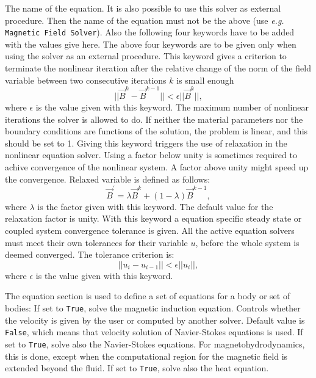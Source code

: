 \sifbegin
{} 
The name of the equation. It is also possible to use this solver as
external procedure. Then the name of the equation must not be the
above (use {\em e.g.} {\tt Magnetic Field Solver}). Also the 
following four keywords have to be added with the values give here.
The above four keywords are to be given only when using the solver as
an external procedure.
 This keyword gives a criterion to
terminate the nonlinear iteration after the relative change of the norm of the field variable
between two consecutive iterations $k$ is small enough
$$
 ||\vec{B}^k-\vec{B}^{k-1}|| < \epsilon ||\vec{B}^k||,
$$
where $\epsilon$ is the value given with this keyword.
The maximum number of nonlinear iterations the
solver is allowed to do. If neither the material parameters nor the boundary
conditions are functions of the solution, the problem is linear, and
this should be set to 1.
 Giving this keyword triggers the use
of  relaxation in the nonlinear equation solver.
Using a factor below unity is sometimes required to achive convergence of the nonlinear system.
A factor above unity might speed up the convergence. Relaxed variable is defined as follows:
$$
 \vec{B}^{'} = \lambda \vec{B}^k + (1-\lambda) \vec{B}^{k-1},
$$
where $\lambda$ is the factor given with this keyword. The default value for the relaxation factor
is unity.
With this keyword a equation specific steady state or coupled system
convergence tolerance is given.
All the active equation solvers must meet their own tolerances for their
variable $u$, before the whole system is deemed converged.
The tolerance criterion is:
$$
 ||u_i-u_{i-1}|| < \epsilon ||u_i||,
$$
where $\epsilon$ is the value given with this keyword.
\sifend

The equation section is used to define a set of equations for a body or set of bodies:
\sifbegin
{} If set to {\tt True}, solve the magnetic induction equation.
Controls whether the velocity is given by the user or computed by
another solver. Default value is {\tt False}, which means that
velocity solution of Navier-Stokes equations is used.
 If set to {\tt True}, solve also the
Navier-Stokes equations. For magnetohydrodynamics, this is done, except when
the computational region for the magnetic field is extended beyond the fluid.
 If set to {\tt True}, solve also the
heat equation.
\sifend


